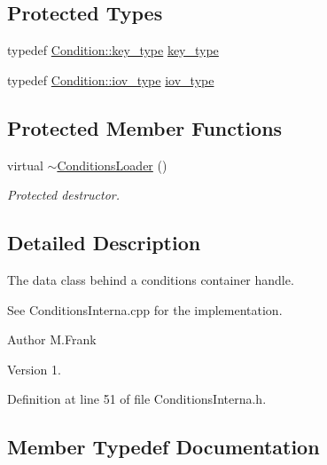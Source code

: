 \subsection*{Protected Types}
\begin{DoxyCompactItemize}
\item 
typedef \hyperlink{class_d_d4hep_1_1_conditions_1_1_condition_a7528efa762e8cc072ef80ea67c3531f9}{Condition\+::key\+\_\+type} \hyperlink{class_d_d4hep_1_1_conditions_1_1_conditions_loader_ac77fe60ee60373d61aed19b200949c93}{key\+\_\+type}
\item 
typedef \hyperlink{class_d_d4hep_1_1_conditions_1_1_condition_ad84300e226b2085ec5e9db7f47be5539}{Condition\+::iov\+\_\+type} \hyperlink{class_d_d4hep_1_1_conditions_1_1_conditions_loader_a5647851492a3b1469208473fe6d96329}{iov\+\_\+type}
\end{DoxyCompactItemize}
\subsection*{Protected Member Functions}
\begin{DoxyCompactItemize}
\item 
virtual \hyperlink{class_d_d4hep_1_1_conditions_1_1_conditions_loader_aabdcec15084838715825303678ba3e69}{$\sim$\+Conditions\+Loader} ()
\begin{DoxyCompactList}\small\item\em Protected destructor. \end{DoxyCompactList}\end{DoxyCompactItemize}


\subsection{Detailed Description}
The data class behind a conditions container handle. 

See Conditions\+Interna.\+cpp for the implementation.

\begin{DoxyAuthor}{Author}
M.\+Frank 
\end{DoxyAuthor}
\begin{DoxyVersion}{Version}
1. 
\end{DoxyVersion}


Definition at line 51 of file Conditions\+Interna.\+h.



\subsection{Member Typedef Documentation}
\hypertarget{class_d_d4hep_1_1_conditions_1_1_conditions_loader_a5647851492a3b1469208473fe6d96329}{}\label{class_d_d4hep_1_1_conditions_1_1_conditions_loader_a5647851492a3b1469208473fe6d96329} 
